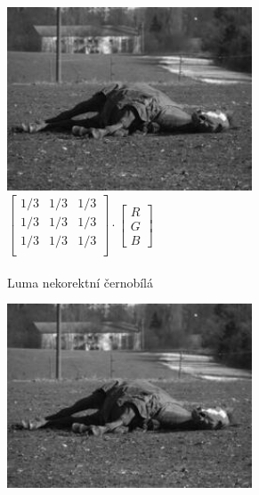 \documentclass[11pt, a4paper, titlepage]{article}
\begin{document}
\begin{figure}[h]
    \centering
    \begin{subfigure}[t]{0.3\textwidth}
        \centering
        \vskip 0pt
        \includegraphics[width=0.8\textwidth]{horse_average.jpg}
        \caption{
        $
            \begin{bmatrix}
                1/3 & 1/3 & 1/3 \\
                1/3 & 1/3 & 1/3 \\
                1/3 & 1/3 & 1/3 \\
            \end{bmatrix}
            \cdot
            \begin{bmatrix}R\\G\\B\end{bmatrix}
        $\\\\Luma nekorektní černobílá
        }
    \end{subfigure}
    \hspace{0.1cm}
    \begin{subfigure}[t]{0.3\textwidth}
        \centering
        \vskip 0pt
        \includegraphics[width=0.8\textwidth]{horse_luma.jpg}

\end{subfigure}
\end{figure}
\end{document}
